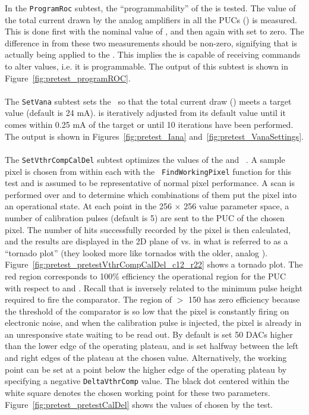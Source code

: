 In the {\tt ProgramRoc} subtest, the ``programmability'' of the \roc is tested.
The value of the total current drawn by the analog amplifiers in all the PUCs (\iana) is measured.
This is done first with the nominal value of \vana, and then again with \vana set to zero.
The difference in \iana from these two measurements should be non-zero,
signifying that \vana is actually being applied to the \roc.
This implies the \roc is capable of receiving commands to alter \dac values, i.e. it is programmable.
The output of this subtest is shown in Figure~\ref{fig:pretest_programROC}.
\\\\
The {\tt SetVana} subtest sets the \vana~\dac so that the total current draw (\iana) meets a target value (default is 24 mA).
\vana is iteratively adjusted from its default value until it comes within 0.25 mA of the target 
or until 10 iterations have been performed.  The output is shown in Figures~\ref{fig:pretest_Iana} and~\ref{fig:pretest_VanaSettings}.
\\\\
The {\tt SetVthrCompCalDel} subtest optimizes the values of the \vthrcomp and \caldel~\dacs.
A sample pixel is chosen from within each \roc with the {\tt
  FindWorkingPixel} function for this test and is assumed to be representative of normal pixel performance.
A scan is performed over \vthrcomp and \caldel to determine which combinations of them put the pixel into an operational state.
At each point in the 256 $\times$ 256 value parameter space,
a number of calibration pulses (default is 5) are sent to the PUC of the chosen pixel.
The number of hits successfully recorded by the pixel is then calculated,
and the results are displayed in the 2D plane of \vthrcomp vs. \caldel 
in what is referred to as a ``tornado plot'' (they looked more like tornados with the older, analog \roc).
Figure~\ref{fig:pretest_pretestVthrCompCalDel_c12_r22} shows a tornado plot.
The red region corresponds to 100\% efficiency \textendash\xspace 
the operational region for the PUC with respect to \vthrcomp and \caldel.
Recall that \vthrcomp is inversely related to the minimum pulse height required to fire the comparator.
The region of \vthrcomp $>$ 150 has zero efficiency because
the threshold of the comparator is so low that the pixel is constantly firing on electronic noise,
and when the calibration pulse is injected,
the pixel is already in an unresponsive state waiting to be read out.
By default \vthrcomp is set 50 DACs higher than the lower edge of the operating plateau,
and \caldel is set halfway between the left and right edges of the
plateau at the chosen \vthrcomp value. Alternatively, the working
point can be set at a point below the higher edge of the operating
plateau by specifying a negative {\tt DeltaVthrComp} value.
The black dot centered within the white square denotes the chosen working point for these two parameters.
Figure~\ref{fig:pretest_pretestCalDel} shows the values of \caldel chosen by the test.

